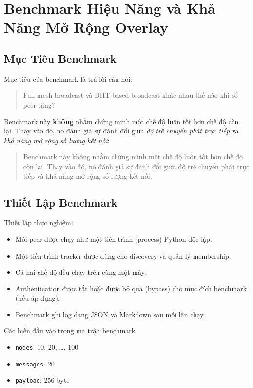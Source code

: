 \section{Benchmark Hiệu Năng và Khả Năng Mở Rộng Overlay}

\subsection{Mục Tiêu Benchmark}
Mục tiêu của benchmark là trả lời câu hỏi:

\begin{quote}
Full mesh broadcast và DHT-based broadcast khác nhau thế nào khi số peer tăng?
\end{quote}

Benchmark này \textbf{không} nhằm chứng minh một chế độ luôn tốt hơn chế độ còn lại. Thay vào đó, nó đánh giá sự đánh đổi giữa \textit{độ trễ chuyển phát trực tiếp} và \textit{khả năng mở rộng số lượng kết nối}:
\begin{quote}
Benchmark này không nhằm chứng minh một chế độ luôn tốt hơn chế độ còn lại. Thay vào đó, nó đánh giá sự đánh đổi giữa độ trễ chuyển phát trực tiếp và khả năng mở rộng số lượng kết nối.
\end{quote}

\subsection{Thiết Lập Benchmark}
Thiết lập thực nghiệm:
\begin{itemize}[leftmargin=2em]
    \item Mỗi peer được chạy như một tiến trình (process) Python độc lập.
    \item Một tiến trình tracker được dùng cho discovery và quản lý membership.
    \item Cả hai chế độ đều chạy trên cùng một máy.
    \item Authentication được tắt hoặc được bỏ qua (bypass) cho mục đích benchmark (nếu áp dụng).
    \item Benchmark ghi log dạng JSON và Markdown sau mỗi lần chạy.
\end{itemize}

Các biến đầu vào trong ma trận benchmark:
\begin{itemize}[leftmargin=2em]
    \item \texttt{nodes}: 10, 20, \ldots, 100
    \item \texttt{messages}: 20
    \item \texttt{payload}: 256 byte
\end{itemize}

